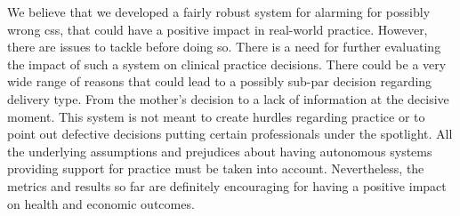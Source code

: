 We believe that we developed a fairly robust system for alarming for possibly wrong \acp{cs}, that could have a positive impact in real-world practice. However, there are issues to tackle before doing so. There is a need for further evaluating the impact of such a system on clinical practice decisions. There could be a very wide range of reasons that could lead to a possibly sub-par decision regarding delivery type. From the mother's decision to a lack of information at the decisive moment. This system is not meant to create hurdles regarding practice or to point out defective decisions putting certain professionals under the spotlight.
All the underlying assumptions and prejudices about having autonomous systems providing support for practice must be taken into account. Nevertheless, the metrics and results so far are definitely encouraging for having a positive impact on health and economic outcomes.
